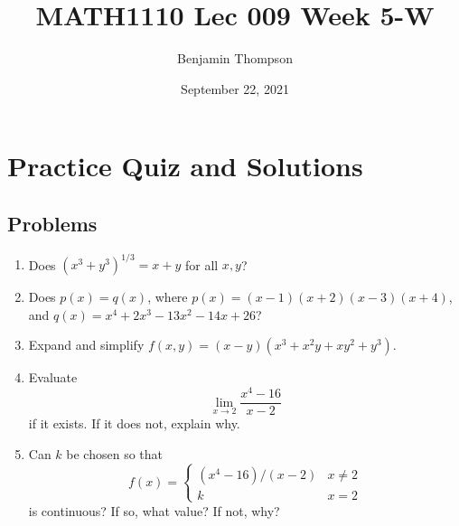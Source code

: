 \documentclass[12pt,a4paper]{article}
\title{MATH1110 Lec 009 Week 5-W}
\author{Benjamin Thompson}
\date{September 22, 2021}
\begin{document}
\section*{Practice Quiz and Solutions}
\subsection*{Problems}
\begin{enumerate}
    \item Does $(x^3 + y^3)^{1/3} = x + y$ for all $x,y$?
    
    \item Does $p(x) = q(x)$, where $p(x) = (x-1)(x+2)(x-3)(x+4)$, and $q(x) = x^4 + 2 x^3 - 13 x^2 - 14 x + 26$?
    
    \item Expand and simplify $f(x,y) = (x - y)(x^3 + x^2y + xy^2 + y^3)$.
    
    \item Evaluate
    \[
        \lim_{x \rightarrow 2} \frac{x^4 - 16}{x-2}
    \]
    if it exists. If it does not, explain why.
    
    \item Can $k$ be chosen so that
    \[
    f(x) = \begin{cases}
        (x^4 - 16)/(x-2) & x \ne 2 \\
        k               & x = 2
    \end{cases}
    \]
    is continuous? If so, what value? If not, why?
\end{enumerate}
\end{document}
